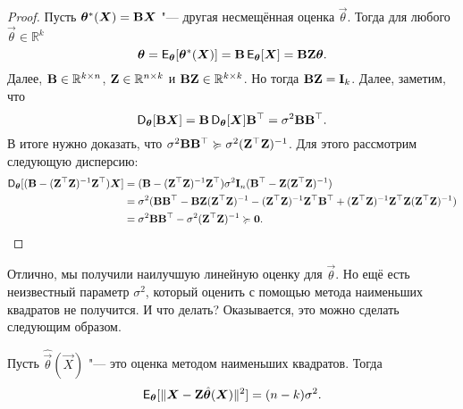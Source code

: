 \begin{proof}
	Пусть $\bm{\theta}^{*}(\bm{X}) = \mathbf{B}\bm{X}$ "--- другая несмещённая оценка $\vec{\theta}$. Тогда для любого $\vec{\theta} \in \mathbb{R}^{k}$
	\[
		\bm{\theta} 
		= \operatorname{\mathsf{E}}_{\bm{\theta}}[\bm{\theta}^{*}(\bm{X})]
		= \mathbf{B}\operatorname{\mathsf{E}}_{\bm{\theta}}[\bm{X}]
		= \mathbf{B}\mathbf{Z}\bm{\theta}.
	\]
	Далее, $\mathbf{B} \in \mathbb{R}^{k \times n}$, $\mathbf{Z} \in \mathbb{R}^{n \times k}$ и $\mathbf{B}\mathbf{Z} \in \mathbb{R}^{k \times k}$. Но тогда $\mathbf{B}\mathbf{Z} = \mathbf{I}_{k}$. Далее, заметим, что
	\[
		\operatorname{\mathsf{D}}_{\bm{\theta}}[\mathbf{B}\bm{X}] = \mathbf{B}\operatorname{\mathsf{D}}_{\bm{\theta}}[\bm{X}]\mathbf{B}^{\top} = \sigma^{2}\mathbf{B}\mathbf{B}^{\top}.
	\]
	В итоге нужно доказать, что $\sigma^{2}\mathbf{B}\mathbf{B}^{\top} \succcurlyeq \sigma^{2}(\mathbf{Z}^{\top}\mathbf{Z})^{-1}$. Для этого рассмотрим следующую дисперсию:
	\begin{align*}
		\operatorname{\mathsf{D}}_{\bm{\theta}}[(\mathbf{B} - (\mathbf{Z}^{\top}\mathbf{Z})^{-1}\mathbf{Z}^{\top})\bm{X}]
		&= (\mathbf{B} - (\mathbf{Z}^{\top}\mathbf{Z})^{-1}\mathbf{Z}^{\top})\sigma^{2}\mathbf{I}_{n}(\mathbf{B}^{\top} - \mathbf{Z}(\mathbf{Z}^{\top}\mathbf{Z})^{-1}) \\
		&= \sigma^{2}(\mathbf{B}\mathbf{B}^{\top} - \mathbf{B}\mathbf{Z}(\mathbf{Z}^{\top}\mathbf{Z})^{-1} - (\mathbf{Z}^{\top}\mathbf{Z})^{-1}\mathbf{Z}^{\top}\mathbf{B}^{\top} + (\mathbf{Z}^{\top}\mathbf{Z})^{-1}\mathbf{Z}^{\top}\mathbf{Z}(\mathbf{Z}^{\top}\mathbf{Z})^{-1}) \\
		&= \sigma^{2}\mathbf{B}\mathbf{B}^{\top} - \sigma^{2}(\mathbf{Z}^{\top}\mathbf{Z})^{-1} \succcurlyeq \mathbf{0}. \qedhere
	\end{align*}
\end{proof}
Отлично, мы получили наилучшую линейную оценку для $\vec{\theta}$. Но ещё есть неизвестный параметр $\sigma^{2}$, который оценить с помощью метода наименьших квадратов не получится. И что делать? Оказывается, это можно сделать следующим образом.
\begin{lemma}
 	Пусть $\hat{\vec{\theta}}(\vec{X})$ "--- это оценка методом наименьших квадратов. Тогда
	\[
		\operatorname{\mathsf{E}}_{\bm{\theta}}[\|\bm{X} - \mathbf{Z}\hat{\bm{\theta}}(\bm{X})\|^{2}] = (n - k)\sigma^{2}.
	\]
\end{lemma}
